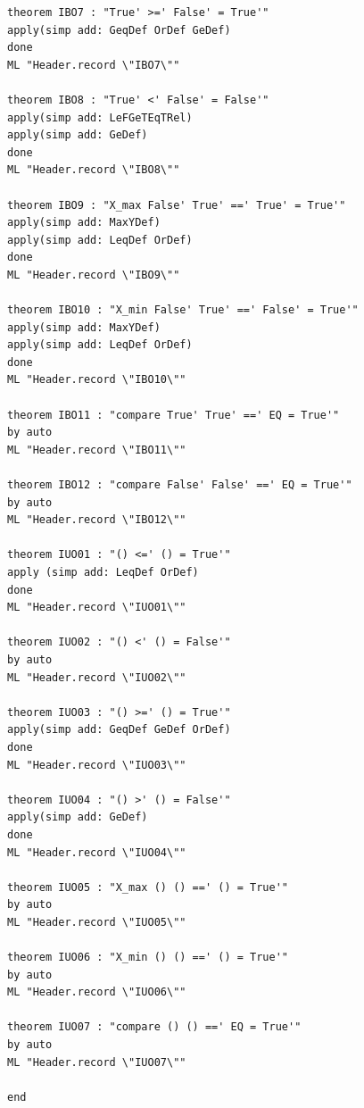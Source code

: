 \documentclass[12pt,twoside]{article}
\numberwithin{spec}{subsection}
\numberwithin{proof}{subsection}
\numberwithin{figure}{subsection}
\numberwithin{code}{subsection}
\begin{document}
\begin{multicols}{2}
\begin{verbatim}
theorem IBO7 : "True' >=' False' = True'"
apply(simp add: GeqDef OrDef GeDef)
done
ML "Header.record \"IBO7\""

theorem IBO8 : "True' <' False' = False'"
apply(simp add: LeFGeTEqTRel)
apply(simp add: GeDef)
done
ML "Header.record \"IBO8\""

theorem IBO9 : "X_max False' True' ==' True' = True'"
apply(simp add: MaxYDef)
apply(simp add: LeqDef OrDef)
done
ML "Header.record \"IBO9\""

theorem IBO10 : "X_min False' True' ==' False' = True'"
apply(simp add: MaxYDef)
apply(simp add: LeqDef OrDef)
done
ML "Header.record \"IBO10\""

theorem IBO11 : "compare True' True' ==' EQ = True'"
by auto
ML "Header.record \"IBO11\""

theorem IBO12 : "compare False' False' ==' EQ = True'"
by auto
ML "Header.record \"IBO12\""

theorem IUO01 : "() <=' () = True'"
apply (simp add: LeqDef OrDef)
done
ML "Header.record \"IUO01\""

theorem IUO02 : "() <' () = False'"
by auto
ML "Header.record \"IUO02\""

theorem IUO03 : "() >=' () = True'"
apply(simp add: GeqDef GeDef OrDef)
done
ML "Header.record \"IUO03\""

theorem IUO04 : "() >' () = False'"
apply(simp add: GeDef)
done
ML "Header.record \"IUO04\""

theorem IUO05 : "X_max () () ==' () = True'"
by auto
ML "Header.record \"IUO05\""

theorem IUO06 : "X_min () () ==' () = True'"
by auto
ML "Header.record \"IUO06\""

theorem IUO07 : "compare () () ==' EQ = True'"
by auto
ML "Header.record \"IUO07\""

end
\end{verbatim}
\end{multicols}
\end{document}
